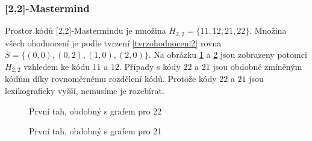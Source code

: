 \subsubsection{[2,2]-Mastermind}
Prostor kódů [2,2]-Mastermindu je množina $H_{2,2} = \{11,12,21,22\}$. Množina všech ohodnocení je podle tvrzení \ref{tvrzohodnoceni2} rovna $S = \{(0,0), (0,2), (1,0), (2,0)\}$. Na obrázku \ref{fig22prvnitah11} a \ref{fig22prvnitah12} jsou zobrazeny potomci $H_{2,2}$ vzhledem ke kódu $11$ a $12$. Případy s kódy $22$ a $21$ jsou obdobné zmíněným kódům díky rovnoměrnému rozdělení kódů. Protože kódy $22$ a $21$ jsou lexikograficky vyšší, nemusíme je rozebírat. 
\begin{figure}[h!]
    \centering
    \caption{První tah, obdobný s grafem pro 22}
    \label{fig22prvnitah11}
    \end{figure}
\begin{figure}[h!]
    \centering
    \caption{První tah, obdobný s grafem pro 21}
    \label{fig22prvnitah12}
\end{figure}

